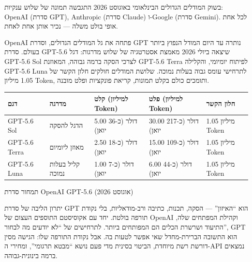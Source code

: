 


בשוק המודלים הגדולים הבינלאומי באוגוסט 2026 התגבשה תמונה של שלוש ענקיות: OpenAI (סדרת GPT), Anthropic (סדרת Claude) ו-Google (סדרת Gemini). לכל אחת אופי בולט משלה — נכיר אותן אחת לאחת.


OpenAI פתחה את גל המודלים הגדולים, וסדרת GPT נותרה עד היום המודל הנפוץ ביותר בעולם. סדרת GPT-5.6 שיצאה ביולי 2026 מאמצת אסטרטגיה של שלוש מדרגות: דגל GPT-5.6 Sol לצרכי הסקה ברמה גבוהה, המאוזנת GPT-5.6 Terra לפיתוח יומיומי, והקלילה GPT-5.6 Luna לתרחישי עומס גבוה בעלות נמוכה. שלושת המודלים חולקים חלון הקשר של 1.05 מיליון Token, ותומכים כולם בקלט תמונות, קריאת פונקציות ופלט מובנה.

\begin{center}
\begin{tabularx}{\linewidth}{|X|X|X|X|X|}
\hline
\textbf{דגם} & \textbf{מדרגה} & \textbf{קלט (למיליון Token)} & \textbf{פלט (למיליון Token)} & \textbf{חלון הקשר} \tabularnewline
\hline
GPT-5.6 Sol & הדגל להסקה & 5.00 דולר (כ-36 יואן) & 30.00 דולר (כ-217 יואן) & 1.05 מיליון Token \tabularnewline
GPT-5.6 Terra & מאוזן ליומיום & 2.50 דולר (כ-18 יואן) & 15.00 דולר (כ-109 יואן) & 1.05 מיליון Token \tabularnewline
GPT-5.6 Luna & קליל בעלות נמוכה & 1.00 דולר (כ-7 יואן) & 6.00 דולר (כ-44 יואן) & 1.05 מיליון Token \tabularnewline
\hline
\end{tabularx}
\end{center}

\begin{center}\small\color{gray}תמחור סדרת OpenAI GPT-5.6 (אוגוסט 2026)\end{center}

יתרון הליבה של סדרת GPT הוא “האיזון” — הסקה, תכנות, כתיבה ורב-מודאליות, בלי נקודת תורפה בולטת. יחד עם אקוסיסטם התוספים העצום של OpenAI וקהילת המפתחים שלה, התיעוד ושרשרת הכלים הם המפותחים ביותר. לתרחישים של “לא יודעים מה לבחור”, GPT הוא התשובה הברירת-מחדל שאי אפשר לטעות בה. אבל נקודת התורפה שלו: הגישה מסין דורשת רשת מיוחדת, הביטוי בסינית מדי פעם נושא “מבטא תרגומי”, ומחירי ה-API נמצאים ברמה בינונית-גבוהה.

